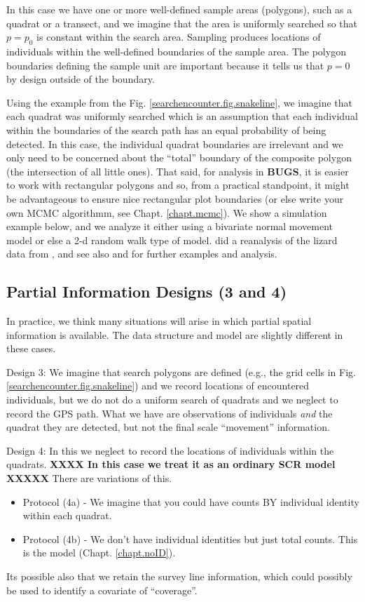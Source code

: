 In this case we
have one or more well-defined sample areas (polygons), such as a
quadrat or a transect, and we imagine that the area is uniformly
searched so that $p = p_0$ is constant within the search area.
Sampling produces locations of individuals within the well-defined
boundaries of the sample area. The polygon boundaries defining the
sample unit are important because it tells us that $p=0$ by design
outside of the boundary.

Using the example from the Fig. \ref{searchencounter.fig.snakeline},
we imagine that each quadrat was uniformly searched which is an
assumption that each individual within the boundaries of the search
path has an equal probability of being detected. In this case, the
individual quadrat boundaries are irrelevant and we only need to be
concerned about the ``total'' boundary of the composite polygon (the
intersection of all little ones). That said, for analysis in {\bf
  BUGS}, it is easier to work with rectangular polygons and so, from a
practical standpoint, it might be advantageous to ensure nice
rectangular plot boundaries (or else write your own MCMC algorithmm,
see Chapt. \ref{chapt.mcmc}).  We show a simulation example below, and
we analyze it either using a bivariate normal movement model or else a
2-d random walk type of model.  \citet{royle_dorazio:2008} did a
reanalysis of the lizard data from \citet{royle_young:2008}, and see
also \citet{efford:2011ecol} and \citet{marques_etal:2011} for further
examples and analysis.


\subsection{Partial Information Designs (3 and 4)}

In practice, we think many situations will arise in which partial
spatial information is available. The data structure and model are
slightly different in these cases.

Design 3: We imagine that search polygons are defined
(e.g., the grid cells in Fig. \ref{searchencounter.fig.snakeline}) and
we record
locations of encountered individuals, but we do not do a uniform search
of quadrats and we neglect to record the GPS path. What we have are
observations of individuals {\it and} the quadrat they are detected,
but not the final scale ``movement'' information. 


Design 4:
In this
we neglect to record the locations of 
individuals within the quadrats.
{\bf XXXX In this case we treat it as an ordinary SCR model XXXXX}
There are variations of this.
\begin{itemize}
\item[] Protocol (4a) - We imagine that you could have
counts BY individual identity within each quadrat.
\item[] Protocol (4b) - We don't have
individual identities but just total counts. This is the
\citet{chandler_royle:2013} model (Chapt. \ref{chapt.noID}).
\end{itemize}
Its possible also that we retain the survey line information, which
could possibly be used to identify a covariate of ``coverage''. 




